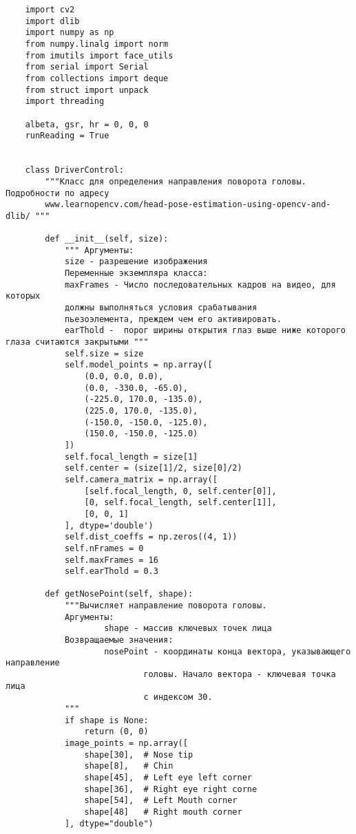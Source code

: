 \begin{verbatim}
    import cv2
    import dlib
    import numpy as np
    from numpy.linalg import norm
    from imutils import face_utils
    from serial import Serial
    from collections import deque
    from struct import unpack
    import threading

    albeta, gsr, hr = 0, 0, 0
    runReading = True


    class DriverControl:
        """Класс для определения направления поворота головы. Подробности по адресу
        www.learnopencv.com/head-pose-estimation-using-opencv-and-dlib/ """

        def __init__(self, size):
            """ Аргументы:
            size - разрешение изображения
            Переменные экземпляра класса:
            maxFrames - Число последовательных кадров на видео, для которых
            должны выполняться условия cрабатывания
            пьезоэлемента, преждем чем его активировать. 
            earThold -  порог ширины открытия глаз выше ниже которого глаза считаются закрытыми """
            self.size = size
            self.model_points = np.array([
                (0.0, 0.0, 0.0),
                (0.0, -330.0, -65.0),
                (-225.0, 170.0, -135.0),
                (225.0, 170.0, -135.0),
                (-150.0, -150.0, -125.0),
                (150.0, -150.0, -125.0)
            ])
            self.focal_length = size[1]
            self.center = (size[1]/2, size[0]/2)
            self.camera_matrix = np.array([
                [self.focal_length, 0, self.center[0]],
                [0, self.focal_length, self.center[1]],
                [0, 0, 1]
            ], dtype='double')
            self.dist_coeffs = np.zeros((4, 1))
            self.nFrames = 0
            self.maxFrames = 16
            self.earThold = 0.3

        def getNosePoint(self, shape):
            """Вычисляет направление поворота головы.
            Аргументы:
                    shape - массив ключевых точек лица
            Возвращаемые значения:
                    nosePoint - координаты конца вектора, указывающего направление
                            головы. Начало вектора - ключевая точка лица
                            с индексом 30.
            """
            if shape is None:
                return (0, 0)
            image_points = np.array([
                shape[30], 	# Nose tip
                shape[8],  	# Chin
                shape[45], 	# Left eye left corner
                shape[36], 	# Right eye right corne
                shape[54], 	# Left Mouth corner
                shape[48]  	# Right mouth corner
            ], dtype="double")


\end{verbatim}
